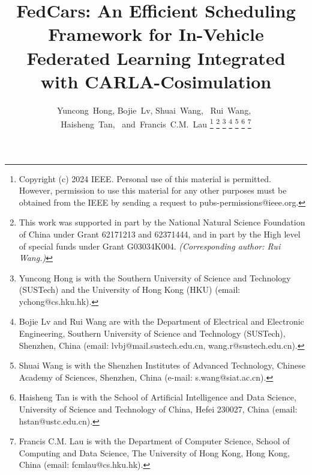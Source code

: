 \documentclass[conference]{IEEEtran} %
\theoremstyle{definition}             %
\theoremstyle{remark}                 %
\theoremstyle{plain}                  %
\newcommand{\fwName}{FedCars}
\begin{document}
    \title{
      {\fwName}: An Efficient Scheduling Framework for In-Vehicle Federated Learning 
      Integrated with CARLA-Cosimulation
    }
    \author{
        Yuncong~Hong,
        Bojie~Lv,
        Shuai~Wang,~ 
        Rui~Wang,~ \\
        Haisheng~Tan,~ 
        and~Francis~C.M.~Lau
        \thanks{
            Copyright (c) 2024 IEEE. Personal use of this material is permitted. However, permission to use this material for any other purposes must be obtained from the IEEE by sending a request to pubs-permissions@ieee.org.
        }
        \thanks{
            This work was supported in part by the National Natural Science Foundation of China under Grant 62171213 and 62371444, and in part by the High level of special funds under Grant G03034K004. {\it (Corresponding author: Rui Wang.)}
        }
        \thanks{
          Yuncong Hong is with the Southern University of Science and Technology (SUSTech) and the University of Hong Kong (HKU) (email: ychong@cs.hku.hk).
        }
        \thanks{
          Bojie Lv and Rui Wang are with the Department of Electrical and Electronic Engineering, Southern University of Science and Technology (SUSTech), Shenzhen, China (email: lvbj@mail.sustech.edu.cn, wang.r@sustech.edu.cn).
        }
        \thanks{
          Shuai Wang is with the Shenzhen Institutes of Advanced Technology, Chinese Academy of Sciences, Shenzhen, China (e-mail: s.wang@siat.ac.cn).
        }
        \thanks{
          Haisheng Tan is with the School of Artificial Intelligence and Data Science, University of Science and Technology of China, Hefei 230027, China (email: hstan@ustc.edu.cn).
        }%
        \thanks{
          Francis C.M. Lau is with the Department of Computer Science, School of Computing and Data Science, The University of Hong Kong, Hong Kong, China (email: fcmlau@cs.hku.hk).
        }%
    }

    \maketitle
    

    
    
    
    
    
    

    \ifCLASSOPTIONcaptionsoff
        \newpage
    \fi

    
    

    
\end{document}
